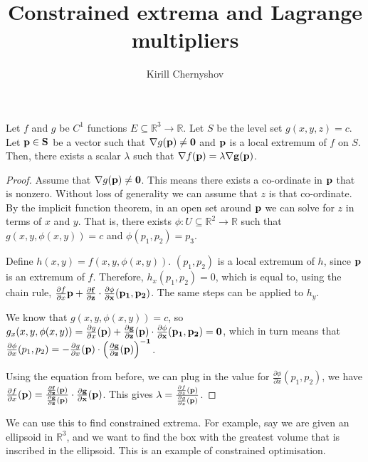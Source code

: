\documentclass[11pt]{amsart}
\newcommand{\name}{Kirill Chernyshov}
\begin{document}
\title{Constrained extrema and Lagrange multipliers}
\author{\name}
\maketitle


Let $f$ and $g$ be $C^1$ functions $E \subseteq \mathbb{R}^3 \rightarrow \mathbb{R}$. Let $S$ be the level set $g(x, y, z) = c$. Let $\bf{p} \in S$ be a vector such that $\nabla g(\bf{p}) \neq 0$ and $\bf{p}$ is a local extremum of $f$ on $S$. Then, there exists a scalar $\lambda$ such that $\nabla f(\bf{p}) = \lambda \nabla g(\bf{p})$.
\bigskip
\begin{proof}
  Assume that $\nabla g(\bf{p}) \neq 0$. This means there exists a co-ordinate in $\bf{p}$ that is nonzero. Without loss of generality we can assume that $z$ is that co-ordinate. By the implicit function theorem, in an open set around $\bf{p}$ we can solve for $z$ in terms of $x$ and $y$. That is, there exists $\phi: U \subseteq \mathbb{R}^2 \rightarrow \mathbb{R}$ such that $g(x, y, \phi(x, y)) = c$ and $\phi(p_1, p_2) = p_3$.

  Define $h(x, y) = f(x, y, \phi(x, y))$. $(p_1, p_2)$ is a local extremum of $h$, since $\bf{p}$ is an extremum of $f$. Therefore, $h_x(p_1, p_2) = 0$, which is equal to, using the chain rule, $\frac{\partial f}{\partial x}\bf{p} + \frac{\partial f}{\partial z} \cdot \frac{\partial \phi}{\partial x}(p_1, p_2)$. The same steps can be applied to $h_y$.

  We know that $g(x, y, \phi(x, y)) = c$, so $g_x(x, y, \phi(x, y)) = \frac{\partial g}{\partial x}(\bf{p}) + \frac{\partial g}{\partial z}(\bf{p}) \cdot \frac{\partial \phi}{\partial x}(p_1, p_2) = 0$, which in turn means that $\frac{\partial \phi}{\partial x}(p_1, p_2) = -\frac{\partial g}{\partial x}(\bf{p}) \cdot \left(\frac{\partial g}{\partial z}(\bf{p})\right)^{-1}$.

  Using the equation from before, we can plug in the value for $\frac{\partial \phi}{\partial x}(p_1, p_2)$, we have $\frac{\partial f}{\partial x}(\bf{p}) = \frac{\frac{\partial f}{\partial z}(\bf{p})}{\frac{\partial g}{\partial z}(\bf{p})} \cdot \frac{\partial g}{\partial x}(\bf{p})$. This gives $\lambda = \frac{\frac{\partial f}{\partial z}(\bf{p})}{\frac{\partial g}{\partial z}(\bf{p})}$.
\end{proof}
\bigskip
We can use this to find constrained extrema. For example, say we are given an ellipsoid in $\mathbb{R}^3$, and we want to find the box with the greatest volume that is inscribed in the ellipsoid. This is an example of constrained optimisation.
\end{document}
